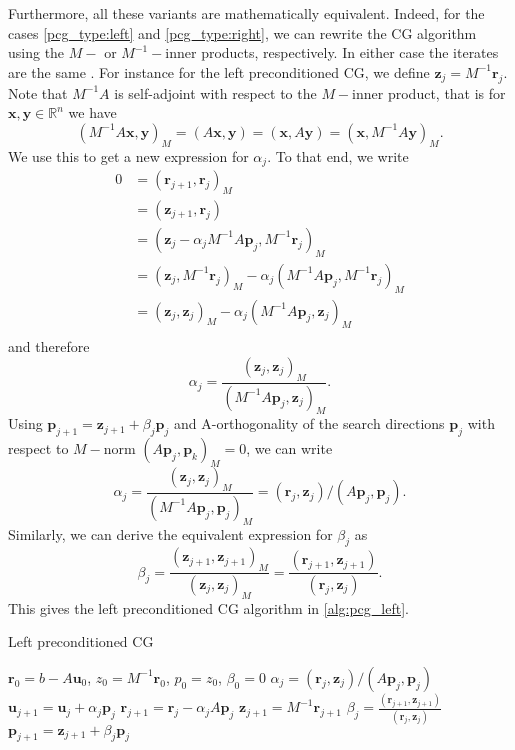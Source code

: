 Furthermore, all these variants are mathematically equivalent. Indeed, for the cases \ref{pcg_type:left} and \ref{pcg_type:right}, we can rewrite the CG algorithm using the $M-$ or $M^{-1}-$inner products, respectively. In either case the iterates are the same \cite[Section 9.2]{iter_method_saad}. For instance for the left preconditioned CG, we define $\mathbf{z}_j = M^{-1}\mathbf{r}_j$. Note that $M^{-1}A$ is self-adjoint with respect to the $M-$inner product, that is for $\mathbf{x},\mathbf{y}\in\mathbb{R}^n$ we have
\[
  (M^{-1}A\mathbf{x}, \mathbf{y})_M = (A\mathbf{x}, \mathbf{y}) = (\mathbf{x}, A\mathbf{y}) = (\mathbf{x}, M^{-1}A\mathbf{y})_M.
\]
We use this to get a new expression for $\alpha_j$. To that end, we write
\begin{align*}
  0 & = (\mathbf{r}_{j+1}, \mathbf{r}_j)_M                                                          \\
    & = (\mathbf{z}_{j+1}, \mathbf{r}_j)                                                            \\
    & = (\mathbf{z}_j - \alpha_j M^{-1}A\mathbf{p}_j, M^{-1}\mathbf{r}_j)_M                         \\
    & = (\mathbf{z}_j, M^{-1}\mathbf{r}_j)_M - \alpha_j (M^{-1}A\mathbf{p}_j, M^{-1}\mathbf{r}_j)_M \\
    & = (\mathbf{z}_j, \mathbf{z}_j)_M - \alpha_j (M^{-1}A\mathbf{p}_j, \mathbf{z}_j)_M             \\
\end{align*}
and therefore
\[
  \alpha_j = \frac{(\mathbf{z}_j, \mathbf{z}_j)_M}{(M^{-1}A\mathbf{p}_j, \mathbf{z}_j)_M}.
\]
Using $\mathbf{p}_{j+1} = \mathbf{z}_{j+1} + \beta_j \mathbf{p}_j$ and A-orthogonality of the search directions $\mathbf{p}_j$ with respect to $M-$norm $(A\mathbf{p}_j, \mathbf{p}_k)_M = 0$, we can write
\[
  \alpha_j = \frac{(\mathbf{z}_j, \mathbf{z}_j)_M}{(M^{-1}A\mathbf{p}_j, \mathbf{p}_j)_M} = (\mathbf{r}_j, \mathbf{z}_j) / (A\mathbf{p}_j, \mathbf{p}_j).
\]
Similarly, we can derive the equivalent expression for $\beta_j$ as
\[
  \beta_j = \frac{(\mathbf{z}_{j+1}, \mathbf{z}_{j+1})_M}{(\mathbf{z}_j, \mathbf{z}_j)_M} = \frac{(\mathbf{r}_{j+1}, \mathbf{z}_{j+1})}{(\mathbf{r}_j, \mathbf{z}_j)}.
\]
This gives the left preconditioned CG algorithm in \ref{alg:pcg_left}.
\begin{algorithm}[H]
  \caption{Left preconditioned CG \cite[Algorithm 9.1]{iter_method_saad}}
  \label{alg:pcg_left}
  \begin{algorithmic}
    \State $\mathbf{r}_0 = b - A\mathbf{u}_0$, $z_0 = M^{-1}\mathbf{r}_0$, $p_0 = z_0$, $\beta_0 = 0$
    \State $\alpha_j = (\mathbf{r}_j, \mathbf{z}_j) / (A\mathbf{p}_j, \mathbf{p}_j)$
    \State $\mathbf{u}_{j+1} = \mathbf{u}_j + \alpha_j \mathbf{p}_j$
    \State $\mathbf{r}_{j+1} = \mathbf{r}_j - \alpha_j A \mathbf{p}_j$
    \State $\mathbf{z}_{j+1} = M^{-1}\mathbf{r}_{j+1}$
    \State $\beta_j = \frac{(\mathbf{r}_{j+1}, \mathbf{z}_{j+1})}{(\mathbf{r}_j, \mathbf{z}_j)}$
    \State $\mathbf{p}_{j+1} = \mathbf{z}_{j+1} + \beta_j \mathbf{p}_j$
    \EndFor
  \end{algorithmic}
\end{algorithm}
